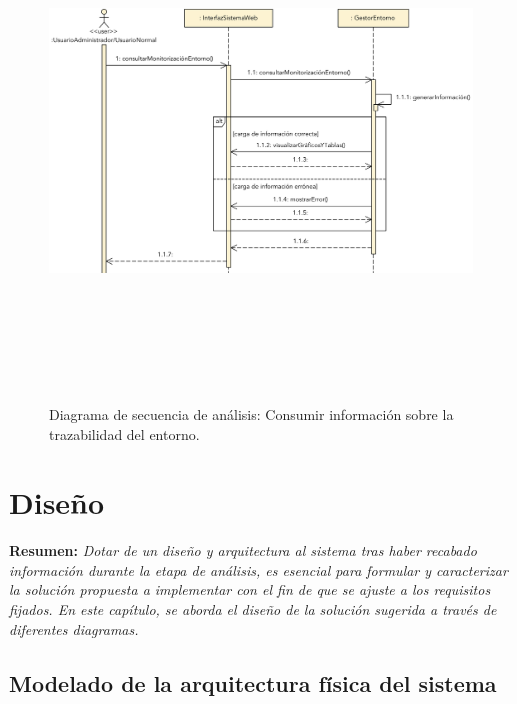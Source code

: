 \documentclass[12pt,a4paper, twoside]{report}
\begin{document}
\begin{itemize}
		\begin{figure}[!ht]   
			\caption{Diagrama de secuencia de análisis: Consumir información sobre la trazabilidad del entorno.} 
			\begin{center} 
	 			\includegraphics[width=17.5cm,height=13cm]{Images/analysis/secuencia/secuencia_consumirInformacion} \\
				\label{fig:ds_consumirInfo} 
			\end{center}  
		\end{figure} 
		
	\end{itemize}

	\chapter{Diseño} \label{designChapter}
	
	\textbf{Resumen:} \textit{Dotar de un diseño y arquitectura al sistema tras haber recabado información durante la etapa de análisis, es esencial para formular y caracterizar la solución propuesta a implementar con el fin de que se ajuste a los requisitos fijados. En este capítulo, se aborda el diseño de la solución sugerida a través de diferentes diagramas.}
	
	\section{Modelado de la arquitectura física del sistema}
	
\end{document}
